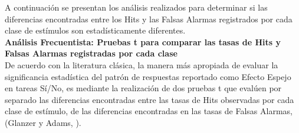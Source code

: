 A continuación se presentan los análisis realizados para determinar si las diferencias encontradas entre los Hits y las Falsas Alarmas registrados por cada clase de estímulos son estadísticamente diferentes.\\

\textbf{Análisis Frecuentista: Pruebas t para comparar las tasas de Hits y Falsas Alarmas registradas por cada clase}\\

De acuerdo con la literatura clásica, la manera más apropiada de evaluar la significancia estadística del patrón de respuestas reportado como Efecto Espejo en tareas Sí/No, es mediante la realización de dos pruebas t que evalúen por separado las diferencias encontradas entre las tasas de Hits observadas por cada clase de estímulo, de las diferencias encontradas en las tasas de Falsas Alarmas, (Glanzer y Adams, \citeyear{Glanzer1990}).\\



